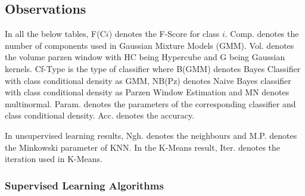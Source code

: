 \documentclass[12pt,journal,compsoc]{IEEEtran}
\begin{document}
\subsection{Observations}
\noindent In all the below tables, F(C$i$) denotes the F-Score for class $i$. Comp. denotes the number of components used in Gaussian Mixture Models (GMM). Vol. denotes the volume parzen window with HC being Hypercube and G being Gaussian kernels. Cf-Type is the type of classifier where B(GMM) denotes Bayes Classifier with class conditional density as GMM, NB(Pz) denotes Naive Bayes classifier with class conditional density as Parzen Window Estimation and MN denotes multinormal. Param. denotes the parameters of the corresponding classifier and class conditional density. Acc. denotes the accuracy.

\noindent In unsupervised learning results, Ngh. denotes the neighbours and M.P. denotes the Minkowski parameter of KNN. In the K-Means result, Iter. denotes the iteration used in K-Means.
\vspace*{0.2 cm}
\subsubsection{Supervised Learning Algorithms}
\vspace*{0.2 cm}
\end{document}

